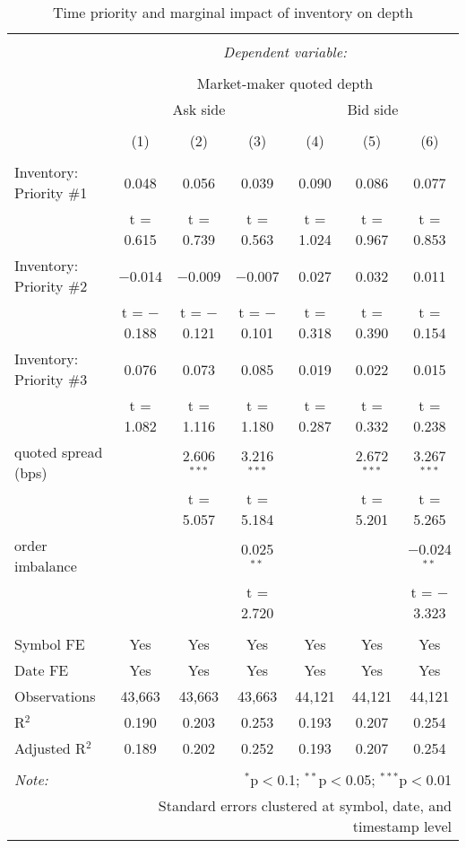 
\begin{table}[!htbp] \centering 
  \caption{Time priority and marginal impact of inventory on depth } 
  \label{} 
\begin{tabular}{@{\extracolsep{5pt}}lcccccc} 
\\[-1.8ex]\hline 
\hline \\[-1.8ex] 
 & \multicolumn{6}{c}{\textit{Dependent variable:}} \\ 
\cline{2-7} 
\\[-1.8ex] & \multicolumn{6}{c}{Market-maker quoted depth} \\ 
 & \multicolumn{3}{c}{Ask side} & \multicolumn{3}{c}{Bid side} \\ 
\\[-1.8ex] & (1) & (2) & (3) & (4) & (5) & (6)\\ 
\hline \\[-1.8ex] 
 Inventory: Priority \#1 & 0.048 & 0.056 & 0.039 & 0.090 & 0.086 & 0.077 \\ 
  & t = 0.615 & t = 0.739 & t = 0.563 & t = 1.024 & t = 0.967 & t = 0.853 \\ 
  Inventory: Priority \#2 & $-$0.014 & $-$0.009 & $-$0.007 & 0.027 & 0.032 & 0.011 \\ 
  & t = $-$0.188 & t = $-$0.121 & t = $-$0.101 & t = 0.318 & t = 0.390 & t = 0.154 \\ 
  Inventory: Priority \#3 & 0.076 & 0.073 & 0.085 & 0.019 & 0.022 & 0.015 \\ 
  & t = 1.082 & t = 1.116 & t = 1.180 & t = 0.287 & t = 0.332 & t = 0.238 \\ 
  quoted spread (bps) &  & 2.606$^{***}$ & 3.216$^{***}$ &  & 2.672$^{***}$ & 3.267$^{***}$ \\ 
  &  & t = 5.057 & t = 5.184 &  & t = 5.201 & t = 5.265 \\ 
  order imbalance &  &  & 0.025$^{**}$ &  &  & $-$0.024$^{**}$ \\ 
  &  &  & t = 2.720 &  &  & t = $-$3.323 \\ 
 \hline \\[-1.8ex] 
Symbol FE & Yes & Yes & Yes & Yes & Yes & Yes \\ 
Date FE & Yes & Yes & Yes & Yes & Yes & Yes \\ 
Observations & 43,663 & 43,663 & 43,663 & 44,121 & 44,121 & 44,121 \\ 
R$^{2}$ & 0.190 & 0.203 & 0.253 & 0.193 & 0.207 & 0.254 \\ 
Adjusted R$^{2}$ & 0.189 & 0.202 & 0.252 & 0.193 & 0.207 & 0.254 \\ 
\hline 
\hline \\[-1.8ex] 
\textit{Note:}  & \multicolumn{6}{r}{$^{*}$p$<$0.1; $^{**}$p$<$0.05; $^{***}$p$<$0.01} \\ 
 & \multicolumn{6}{r}{Standard errors clustered at symbol, date, and timestamp level} \\ 
\end{tabular} 
\end{table} 
